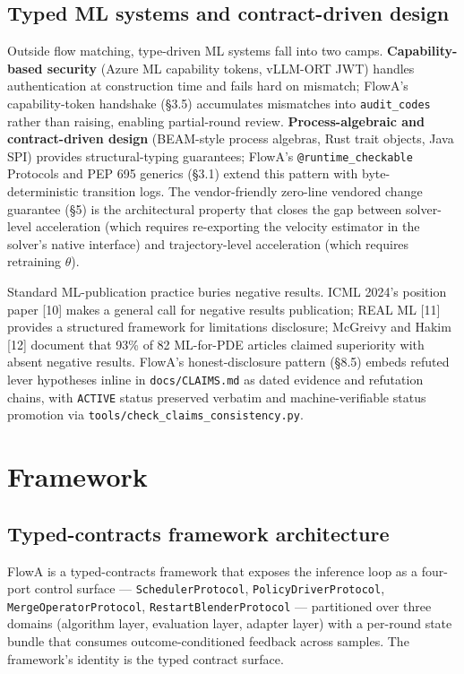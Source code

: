 \documentclass[journal,twocolumn,final]{IEEEtran}
\begin{document}
\subsection{Typed ML systems and contract-driven design}

Outside flow matching, type-driven ML systems fall into two camps. \textbf{Capability-based security} (Azure ML capability tokens, vLLM-ORT JWT) handles authentication at construction time and fails hard on mismatch; FlowA's capability-token handshake (\S3.5) accumulates mismatches into \texttt{audit\_codes} rather than raising, enabling partial-round review. \textbf{Process-algebraic and contract-driven design} (BEAM-style process algebras, Rust trait objects, Java SPI) provides structural-typing guarantees; FlowA's \texttt{@runtime\_checkable} Protocols and PEP 695 generics (\S3.1) extend this pattern with byte-deterministic transition logs. The vendor-friendly zero-line vendored change guarantee (\S5) is the architectural property that closes the gap between solver-level acceleration (which requires re-exporting the velocity estimator in the solver's native interface) and trajectory-level acceleration (which requires retraining $\theta$).

Standard ML-publication practice buries negative results. ICML 2024's position paper [10] makes a general call for negative results publication; REAL ML [11] provides a structured framework for limitations disclosure; McGreivy and Hakim [12] document that 93\% of 82 ML-for-PDE articles claimed superiority with absent negative results. FlowA's honest-disclosure pattern (\S8.5) embeds refuted lever hypotheses inline in \texttt{docs/CLAIMS.md} as dated evidence and refutation chains, with \texttt{ACTIVE} status preserved verbatim and machine-verifiable status promotion via \texttt{tools/check\_claims\_consistency.py}.



\section{Framework}
\label{sec:framework}

\subsection{Typed-contracts framework architecture}

FlowA is a typed-contracts framework that exposes the inference loop as a four-port control surface --- \texttt{SchedulerProtocol}, \texttt{PolicyDriverProtocol}, \texttt{MergeOperatorProtocol}, \texttt{RestartBlenderProtocol} --- partitioned over three domains (algorithm layer, evaluation layer, adapter layer) with a per-round state bundle that consumes outcome-conditioned feedback across samples. The framework's identity is the typed contract surface.
\end{document}
